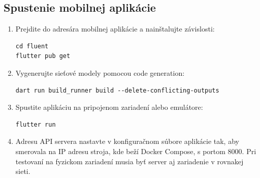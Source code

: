 \subsection{Spustenie mobilnej aplikácie}

\begin{enumerate}
    \item Prejdite do adresára mobilnej aplikácie a nainštalujte závislosti:
    \begin{verbatim}
cd fluent
flutter pub get
    \end{verbatim}
    \item Vygenerujte sieťové modely pomocou code generation:
    \begin{verbatim}
dart run build_runner build --delete-conflicting-outputs
    \end{verbatim}
    \item Spustite aplikáciu na pripojenom zariadení alebo emulátore:
    \begin{verbatim}
flutter run
    \end{verbatim}
    \item Adresu API servera nastavte v konfiguračnom súbore aplikácie tak, aby smerovala na IP adresu stroja, kde beží Docker Compose, s portom 8000. Pri testovaní na fyzickom zariadení musia byť server aj zariadenie v rovnakej sieti.
\end{enumerate}
